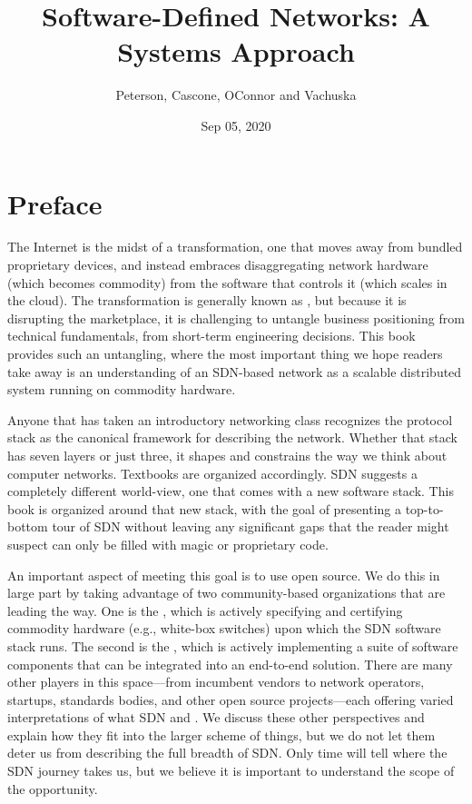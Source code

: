 \documentclass[letterpaper,11pt,english]{sphinxmanual}
\title{Software-Defined Networks: A Systems Approach}
\date{Sep 05, 2020}
\author{Peterson, Cascone, OConnor and Vachuska }
\begin{document}
\pagestyle{empty}
\sphinxmaketitle
\pagestyle{plain}
\sphinxtableofcontents
\pagestyle{normal}
\label{\detokenize{index::doc}}



\chapter{Preface}
\label{\detokenize{preface:preface}}\label{\detokenize{preface::doc}}
The Internet is the midst of a transformation, one that moves away
from bundled proprietary devices, and instead embraces disaggregating
network hardware (which becomes commodity) from the software that
controls it (which scales in the cloud). The transformation is
generally known as , but because it
is disrupting the marketplace, it is challenging to untangle business
positioning from technical fundamentals, from short-term engineering
decisions. This book provides such an untangling, where the most
important thing we hope readers take away is an understanding of an
SDN-based network as a scalable distributed system running on
commodity hardware.

Anyone that has taken an introductory networking class recognizes the
protocol stack as the canonical framework for describing the
network. Whether that stack has seven layers or just three, it shapes
and constrains the way we think about computer networks. Textbooks are
organized accordingly. SDN suggests a completely different world-view,
one that comes with a new software stack. This book is organized
around that new stack, with the goal of presenting a top-to-bottom
tour of SDN without leaving any significant gaps that the reader might
suspect can only be filled with magic or proprietary code. 

An important aspect of meeting this goal is to use open source. We do
this in large part by taking advantage of two community-based
organizations that are leading the way. One is the , which is actively specifying and certifying commodity
hardware (e.g., white-box switches) upon which the SDN software stack
runs. The second is the , which is
actively implementing a suite of software components that can be
integrated into an end-to-end solution. There are many other players
in this space—from incumbent vendors to network operators, startups,
standards bodies, and other open source projects—each offering varied
interpretations of what SDN  and . We discuss these other
perspectives and explain how they fit into the larger scheme of
things, but we do not let them deter us from describing the full
breadth of SDN. Only time will tell where the SDN journey takes us,
but we believe it is important to understand the scope of the
opportunity.
\end{document}
